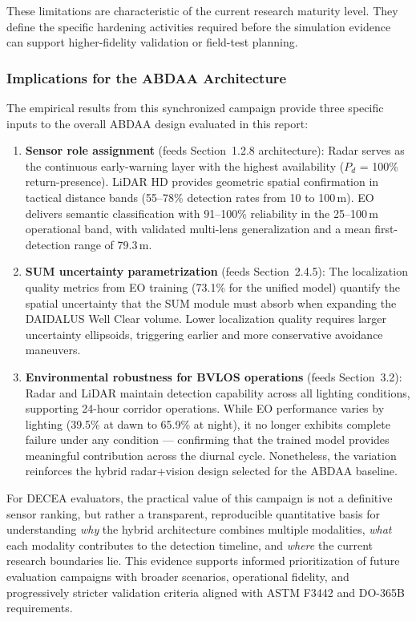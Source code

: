 These limitations are characteristic of the current research maturity level. They define the specific hardening activities required before the simulation evidence can support higher-fidelity validation or field-test planning.

\subsubsection{Implications for the ABDAA Architecture}
\label{sec:multisensor-implications}

The empirical results from this synchronized campaign provide three specific inputs to the overall ABDAA design evaluated in this report:

\begin{enumerate}
  \item \textbf{Sensor role assignment} (feeds Section~1.2.8 architecture): Radar serves as the continuous early-warning layer with the highest availability ($P_d$ = 100\% return-presence). LiDAR HD provides geometric spatial confirmation in tactical distance bands (55--78\% detection rates from 10 to 100\,m). EO delivers semantic classification with 91--100\% reliability in the 25--100\,m operational band, with validated multi-lens generalization and a mean first-detection range of 79.3\,m.

  \item \textbf{SUM uncertainty parametrization} (feeds Section~2.4.5): The localization quality metrics from EO training (73.1\% for the unified model) quantify the spatial uncertainty that the SUM module must absorb when expanding the DAIDALUS Well Clear volume. Lower localization quality requires larger uncertainty ellipsoids, triggering earlier and more conservative avoidance maneuvers.

  \item \textbf{Environmental robustness for BVLOS operations} (feeds Section~3.2): Radar and LiDAR maintain detection capability across all lighting conditions, supporting 24-hour corridor operations. While EO performance varies by lighting (39.5\% at dawn to 65.9\% at night), it no longer exhibits complete failure under any condition --- confirming that the trained model provides meaningful contribution across the diurnal cycle. Nonetheless, the variation reinforces the hybrid radar+vision design selected for the ABDAA baseline.
\end{enumerate}

For DECEA evaluators, the practical value of this campaign is not a definitive sensor ranking, but rather a transparent, reproducible quantitative basis for understanding \emph{why} the hybrid architecture combines multiple modalities, \emph{what} each modality contributes to the detection timeline, and \emph{where} the current research boundaries lie. This evidence supports informed prioritization of future evaluation campaigns with broader scenarios, operational fidelity, and progressively stricter validation criteria aligned with ASTM F3442 and DO-365B requirements.
